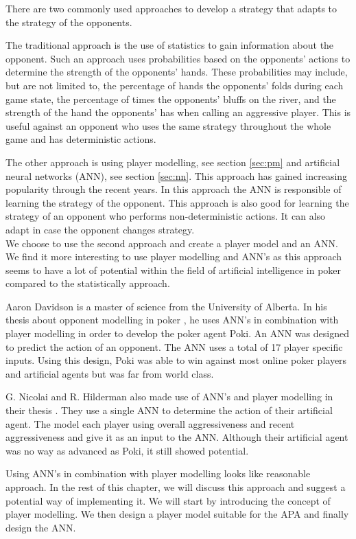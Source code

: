 There are two commonly used approaches to develop a strategy that adapts to the strategy of the opponents.

The traditional approach is the use of statistics to gain information about the opponent. Such an approach uses probabilities based on the opponents' actions to determine the strength of the opponents' hands. These probabilities may include, but are not limited to, the percentage of hands the opponents' folds during each game state, the percentage of times the opponents' bluffs on the river, and the strength of the hand the opponents' has when calling an aggressive player. This is useful against an opponent who uses the same strategy throughout the whole game and has deterministic actions.

The other approach is using player modelling, see section \ref{sec:pm} and artificial neural networks (ANN), see section \ref{sec:nn}. This approach has gained increasing popularity through the recent years. In this approach the ANN is responsible of learning the strategy of the opponent. This approach is also good for learning the strategy of an opponent who performs non-deterministic actions. It can also adapt in case the opponent changes strategy.\\

We choose to use the second approach and create a player model and an ANN. We find it more interesting to use player modelling and ANN's as this approach seems to have a lot of potential within the field of artificial intelligence in poker compared to the statistically approach.

Aaron Davidson is a master of science from the University of Alberta. In his thesis about opponent modelling in poker \cite{opponent-modeling}, he uses ANN's in combination with player modelling in order to develop the poker agent Poki. An ANN was designed to predict the action of an opponent. The ANN uses a total of 17 player specific inputs. Using this design, Poki was able to win against most online poker players and artificial agents but was far from world class.

G. Nicolai and R. Hilderman also made use of ANN's and player modelling in their thesis \cite{player-agents}. They use a single ANN to determine the action of their artificial agent. The model each player using overall aggressiveness and recent aggressiveness and give it as an input to the ANN. Although their artificial agent was no way as advanced as Poki, it still showed potential.

Using ANN's in combination with player modelling looks like reasonable approach. In the rest of this chapter, we will discuss this approach and suggest a potential way of implementing it. We will start by introducing the concept of player modelling. We then design a player model suitable for the APA and finally design the ANN.

